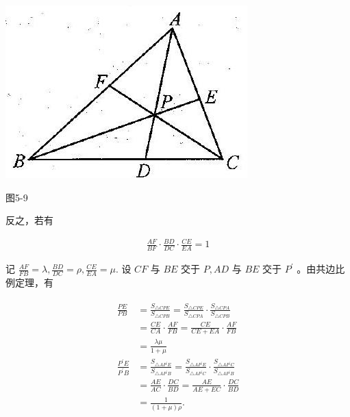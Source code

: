 \documentclass[10pt]{article}
\begin{document}
\begin{center}
\includegraphics[max width=\textwidth]{2024_10_30_2c8f45efd4a519b08e1ag-052}
\end{center}

图5-9

反之，若有

\begin{align*}
\frac{A F}{B F} \cdot \frac{B D}{D C} \cdot \frac{C E}{E A}=1
\end{align*}

记 $\frac{A F}{F B}=\lambda, \frac{B D}{D C}=\rho, \frac{C E}{E A}=\mu$. 设 $C F$ 与 $B E$ 交于 $P, A D$ 与 $B E$ 交于 $P^{\prime}$ 。由共边比例定理，有

\begin{align*}
\begin{aligned}
\frac{P E}{P B} & =\frac{S_{\triangle C P E}}{S_{\triangle C P B}}=\frac{S_{\triangle C P E}}{S_{\triangle C P A}} \cdot \frac{S_{\triangle C P A}}{S_{\triangle C P B}} \\
& =\frac{C E}{C A} \cdot \frac{A F}{F B}=\frac{C E}{C E+E A} \cdot \frac{A F}{F B} \\
& =\frac{\lambda \mu}{1+\mu} \\
\frac{P^{\prime} E}{P^{\prime} B} & =\frac{S_{\triangle A P^{\prime} E}}{S_{\triangle A P^{\prime} B}}=\frac{S_{\triangle A P^{\prime} E}}{S_{\triangle A P^{\prime} C}} \cdot \frac{S_{\triangle A P^{\prime} C}}{S_{\triangle A P^{\prime} B}} \\
& =\frac{A E}{A C} \cdot \frac{D C}{B D}=\frac{A E}{A E+E C} \cdot \frac{D C}{B D} \\
& =\frac{1}{(1+\mu) \rho} .
\end{aligned}
\end{align*}
\end{document}
